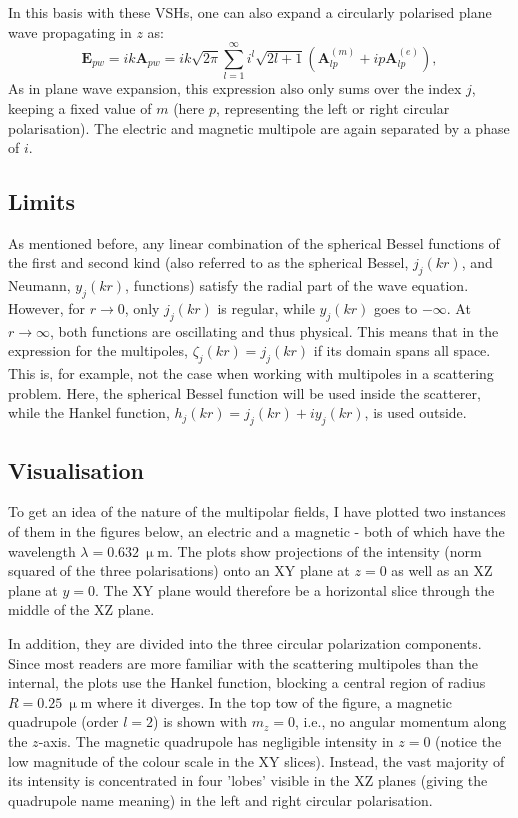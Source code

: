 In this basis with these VSHs, one can also expand a circularly polarised plane wave propagating in \( z \) as:
\begin{equation}\label{eq:rosePW}
    \mathbf{E}_{pw} = ik \mathbf{A}_{pw} = ik \sqrt{2\pi} \sum_{l=1}^{\infty} i^l \sqrt{2l+1} ( \mathbf{A}_{lp}^{(m)} + i p \mathbf{A}_{lp}^{(e)} ),
\end{equation}
As in plane wave expansion, this expression also only sums over the index \( j \), keeping a fixed value of \( m \) (here \( p \), representing the left or right circular polarisation). The electric and magnetic multipole are again separated by a phase of \( i \).

\subsection{Limits}
As mentioned before, any linear combination of the spherical Bessel functions of the first and second kind (also referred to as the spherical Bessel, \( j_j(kr) \), and Neumann, \( y_j(kr) \), functions) satisfy the radial part of the wave equation. However, for \( r \to 0 \), only \( j_j(kr) \) is regular, while \( y_j(kr) \) goes to \( -\infty \). At \( r \to \infty \), both functions are oscillating and thus physical. This means that in the expression for the multipoles, \( \zeta_j(kr) = j_j(kr) \) if its domain spans all space. This is, for example, not the case when working with multipoles in a scattering problem. Here, the spherical Bessel function will be used inside the scatterer, while the Hankel function, \( h_j(kr) = j_j(kr) + i y_j(kr) \), is used outside.

\subsection{Visualisation}
To get an idea of the nature of the multipolar fields, I have plotted two instances of them in the figures below, an electric and a magnetic - both of which have the wavelength \( \lambda = 0.632\ \mathrm{\upmu m} \). The plots show projections of the intensity (norm squared of the three polarisations) onto an XY plane at \( z = 0 \) as well as an XZ plane at \( y = 0 \). The XY plane would therefore be a horizontal slice through the middle of the XZ plane.

In addition, they are divided into the three circular polarization components. Since most readers are more familiar with the scattering multipoles than the internal, the plots use the Hankel function, blocking a central region of radius \( R = 0.25\ \mathrm{\upmu m} \) where it diverges. 
In the top tow of the figure, a magnetic quadrupole (order \( l = 2 \)) is shown with \( m_z = 0 \), i.e., no angular momentum along the \( z \)-axis. 
The magnetic quadrupole has negligible intensity in \( z = 0 \) (notice the low magnitude of the colour scale in the XY slices). Instead, the vast majority of its intensity is concentrated in four 'lobes' visible in the XZ planes (giving the quadrupole name meaning) in the left and right circular polarisation.

